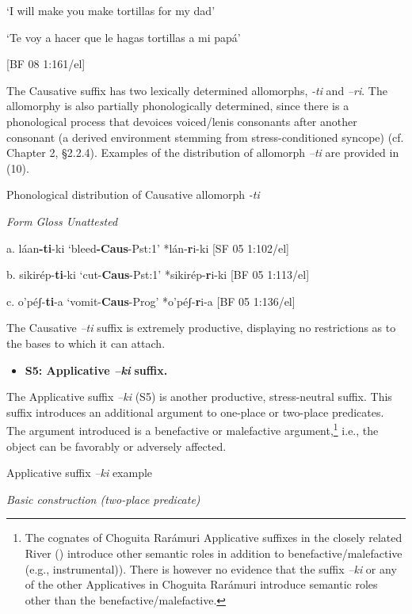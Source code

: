 ‘I will make you make tortillas for my dad’

‘Te voy a hacer que le hagas tortillas a mi papá’  

[BF 08 1:161/el]

The Causative suffix has two lexically determined allomorphs, \textit{{}-ti} and \textit{–ri}. The allomorphy is also partially phonologically determined, since there is a phonological process that devoices voiced/lenis consonants after another consonant (a derived environment stemming from stress-conditioned syncope) (cf. Chapter 2, §2.2.4). Examples of the distribution of allomorph \textit{–ti} are provided in (10).

   Phonological distribution of Causative allomorph \textit{{}-ti}  

\textit{Form    Gloss      Unattested}

a.   láan\textbf{{}-ti}{}-ki  ‘bleed\textbf{{}-Caus}{}-Pst:1’  *lán-\textbf{r}i-ki  [SF 05 1:102/el]

  b.  sikirép-\textbf{ti}{}-ki  ‘cut-\textbf{Caus}{}-Pst:1’  *sikirép-\textbf{r}i-ki  [BF 05 1:113/el]

  c.  o’péʃ-\textbf{ti}{}-a  ‘vomit-\textbf{Caus}{}-Prog’  *o’péʃ-\textbf{r}i-a  [BF 05 1:136/el]

  The Causative \textit{–ti} suffix is extremely productive, displaying no restrictions as to the bases to which it can attach.

\begin{itemize}
\item \textbf{S5: Applicative \textit{–ki} }\textbf{suffix.}
\end{itemize}

The Applicative suffix \textit{–ki} (S5) is another productive, stress-neutral suffix. This suffix introduces an additional argument to one-place or two-place predicates. The  argument introduced is a benefactive or malefactive argument,\footnote{The cognates of Choguita Rarámuri Applicative suffixes in the closely related River  (\citealt{miller1996guarijio}) introduce other semantic roles in addition to benefactive/malefactive (e.g., instrumental)). There is however no evidence that the suffix \textit{–ki} or any of the other Applicatives in Choguita Rarámuri introduce semantic roles other than the benefactive/malefactive.}  i.e., the object can be favorably or adversely affected. 

  Applicative suffix \textit{–ki} example

  \textit{Basic construction (two-place predicate)}

